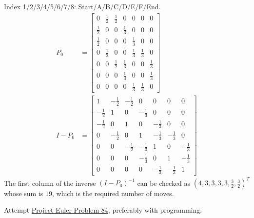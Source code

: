\begin{Answer}
Index 1/2/3/4/5/6/7/8: Start/A/B/C/D/E/F/End. 
\begin{align*}
P_0 &=
\begin{bmatrix}
0 & \frac{1}{2} & \frac{1}{2} & 0 & 0 & 0 & 0\\
\frac{1}{2} & 0 & 0 & \frac{1}{3} & 0 & 0 & 0\\
\frac{1}{2} & 0 & 0 & 0 & \frac{1}{3} & 0 & 0\\
0 & \frac{1}{2} & 0 & 0 & \frac{1}{3} & \frac{1}{3} & 0\\
0 & 0 & \frac{1}{2} & \frac{1}{3} & 0 & 0 & \frac{1}{3}\\
0 & 0 & 0 & \frac{1}{3} & 0 & 0 & \frac{1}{3}\\
0 & 0 & 0 & 0 & \frac{1}{3} & \frac{1}{3} & 0
\end{bmatrix} \\
I - P_0 &= 
\begin{bmatrix}
1&-\frac{1}{2}&-\frac{1}{2}&0&0&0&0\\ 
-\frac{1}{2}&1&0&-\frac{1}{3}&0&0&0\\ 
-\frac{1}{2}&0&1&0&-\frac{1}{3}&0&0\\ 
0&-\frac{1}{2}&0&1&-\frac{1}{3}&-\frac{1}{3}&0\\ 
0&0&-\frac{1}{2}&-\frac{1}{3}&1&0&-\frac{1}{3}\\ 
0&0&0&-\frac{1}{3}&0&1&-\frac{1}{3}\\ 
0&0&0&0&-\frac{1}{3}&-\frac{1}{3}&1
\end{bmatrix} 
\end{align*}
The first column of the inverse $(I - P_0)^{-1}$ can be checked as $(4,3,3,3,3,\frac{3}{2},\frac{3}{2})^T$ whose sum is $19$, which is the required number of moves.
\end{Answer}

\begin{Exercise}
Attempt \href{https://projecteuler.net/problem=84}{Project Euler Problem 84}, preferably with programming.
\end{Exercise}